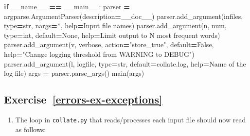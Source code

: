 \documentclass[
]{krantz}
\makeatletter
\newenvironment{Shaded}{\begin{snugshade}}{\end{snugshade}}
\newcommand{\BuiltInTok}[1]{#1}
\newcommand{\ControlFlowTok}[1]{\textcolor[rgb]{0.13,0.29,0.53}{\textbf{#1}}}
\newcommand{\NormalTok}[1]{#1}
\newcommand{\OperatorTok}[1]{\textcolor[rgb]{0.81,0.36,0.00}{\textbf{#1}}}
\newcommand{\StringTok}[1]{\textcolor[rgb]{0.31,0.60,0.02}{#1}}
\newcommand{\VariableTok}[1]{\textcolor[rgb]{0.00,0.00,0.00}{#1}}
\providecommand{\tightlist}{%
  \setlength{\itemsep}{0pt}\setlength{\parskip}{0pt}}
\newenvironment{kframe}{%
\medskip{}
\setlength{\fboxsep}{.8em}
 \def\at@end@of@kframe{}%
 \ifinner\ifhmode%
  \def\at@end@of@kframe{\end{minipage}}%
  \begin{minipage}{\columnwidth}%
 \fi\fi%
 \def\FrameCommand##1{\hskip\@totalleftmargin \hskip-\fboxsep
 \colorbox{shadecolor}{##1}\hskip-\fboxsep
     \hskip-\linewidth \hskip-\@totalleftmargin \hskip\columnwidth}%
 \MakeFramed {\advance\hsize-\width
   \@totalleftmargin\z@ \linewidth\hsize
   \@setminipage}}%
 {\par\unskip\endMakeFramed%
 \at@end@of@kframe}
\renewenvironment{Shaded}{\begin{kframe}}{\end{kframe}}
\makeatother
\begin{document}
\begin{Shaded}
\begin{Highlighting}[]
\ControlFlowTok{if} \VariableTok{\_\_name\_\_} \OperatorTok{==} \StringTok{\textquotesingle{}\_\_main\_\_\textquotesingle{}}\NormalTok{:}
\NormalTok{    parser }\OperatorTok{=}\NormalTok{ argparse.ArgumentParser(description}\OperatorTok{=}\NormalTok{\_\_doc\_\_)}
\NormalTok{    parser.add\_argument(}\StringTok{\textquotesingle{}infiles\textquotesingle{}}\NormalTok{, }\BuiltInTok{type}\OperatorTok{=}\BuiltInTok{str}\NormalTok{, nargs}\OperatorTok{=}\StringTok{\textquotesingle{}*\textquotesingle{}}\NormalTok{, }\BuiltInTok{help}\OperatorTok{=}\StringTok{\textquotesingle{}Input file names\textquotesingle{}}\NormalTok{)}
\NormalTok{    parser.add\_argument(}\StringTok{\textquotesingle{}{-}n\textquotesingle{}}\NormalTok{, }\StringTok{\textquotesingle{}{-}{-}num\textquotesingle{}}\NormalTok{, }\BuiltInTok{type}\OperatorTok{=}\BuiltInTok{int}\NormalTok{, default}\OperatorTok{=}\VariableTok{None}\NormalTok{,}
                        \BuiltInTok{help}\OperatorTok{=}\StringTok{\textquotesingle{}Limit output to N most frequent words\textquotesingle{}}\NormalTok{)}
\NormalTok{    parser.add\_argument(}\StringTok{\textquotesingle{}{-}v\textquotesingle{}}\NormalTok{, }\StringTok{\textquotesingle{}{-}{-}verbose\textquotesingle{}}\NormalTok{, action}\OperatorTok{=}\StringTok{"store\_true"}\NormalTok{, default}\OperatorTok{=}\VariableTok{False}\NormalTok{,}
                        \BuiltInTok{help}\OperatorTok{=}\StringTok{"Change logging threshold from WARNING to DEBUG"}\NormalTok{)}
\NormalTok{    parser.add\_argument(}\StringTok{\textquotesingle{}{-}l\textquotesingle{}}\NormalTok{, }\StringTok{\textquotesingle{}{-}{-}logfile\textquotesingle{}}\NormalTok{, }\BuiltInTok{type}\OperatorTok{=}\BuiltInTok{str}\NormalTok{, default}\OperatorTok{=}\StringTok{\textquotesingle{}collate.log\textquotesingle{}}\NormalTok{,}
                        \BuiltInTok{help}\OperatorTok{=}\StringTok{\textquotesingle{}Name of the log file\textquotesingle{}}\NormalTok{)}
\NormalTok{    args }\OperatorTok{=}\NormalTok{ parser.parse\_args()}
\NormalTok{    main(args)}
\end{Highlighting}
\end{Shaded}

\hypertarget{exercise-referrors-ex-exceptions}{%
\subsection*{Exercise~\ref{errors-ex-exceptions}}\label{exercise-referrors-ex-exceptions}}


\begin{enumerate}
\def\labelenumi{\arabic{enumi}.}
\tightlist
\item
  The loop in \texttt{collate.py} that reads/processes each input file
  should now read as follows:
\end{enumerate}
\end{document}
